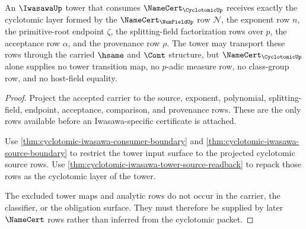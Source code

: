 \begin{theorem}
\label{thm:cyclotomic-iwasawa-tower-obligation}
An $\IwasawaUp$ tower that consumes $\NameCert_{\CyclotomicUp}$ receives exactly the cyclotomic layer formed by the $\NameCert_{\NumFieldUp}$ row $\mathcal{N}$, the exponent row $n$, the primitive-root endpoint $\zeta$, the splitting-field factorization rows over $p$, the acceptance row $\alpha$, and the provenance row $\rho$. The tower may transport these rows through the carried $\hsame$ and $\Cont$ structure, but $\NameCert_{\CyclotomicUp}$ alone supplies no tower transition map, no $p$-adic measure row, no class-group row, and no host-field equality.
\end{theorem}
\begin{proof}
Project the accepted carrier to the source, exponent, polynomial, splitting-field, endpoint, acceptance, comparison, and provenance rows. These are the only rows available before an Iwasawa-specific certificate is attached.

Use \autoref{thm:cyclotomic-iwasawa-consumer-boundary} and \autoref{thm:cyclotomic-iwasawa-source-boundary} to restrict the tower input surface to the projected cyclotomic source rows. Use \autoref{thm:cyclotomic-iwasawa-tower-source-readback} to repack those rows as the cyclotomic layer of the tower.

The excluded tower maps and analytic rows do not occur in the carrier, the classifier, or the obligation surface. They must therefore be supplied by later $\NameCert$ rows rather than inferred from the cyclotomic packet.
\end{proof}

